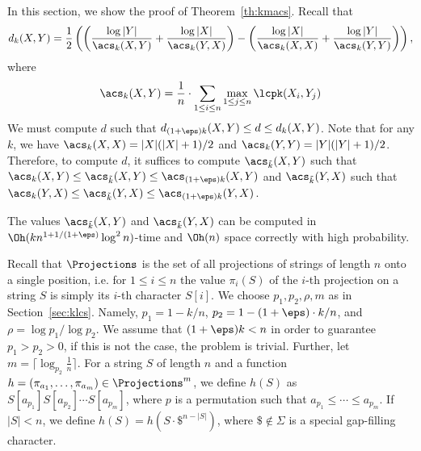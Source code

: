 In this section, we show the proof of Theorem~\ref{th:kmacs}. Recall that 
$$d_k(X, Y) = \frac{1}{2} \left(\left( \frac{\log |Y|}{\acs_k(X, Y)} + \frac{\log |X|}{\acs_k(Y,X)}\right) - \left(\frac{\log |X|}{\acs_k(X, X)} + \frac{\log |Y|}{\acs_k(Y, Y)}\right)\right),$$ 
where
$$\acs_k(X, Y) = \frac{1}{n} \cdot \sum_{1 \le i \le n} \max_{1 \le j \le n} \lcpk(X_i, Y_j)$$
We must compute $d$ such that $d_{(1+\eps)k} (X, Y) \le d \le d_{k} (X, Y)$. Note that for any $k$, we have $\acs_k(X, X) = |X| (|X|+1) / 2$ and $\acs_k(Y, Y) = |Y| (|Y|+1) / 2$. Therefore, to compute $d$, it suffices to compute $\acs_{\tilde{k}} (X, Y)$ such that $\acs_{k} (X, Y) \le \acs_{\tilde{k}} (X, Y) \le \acs_{(1+\eps)k} (X, Y)$ and $\acs_{\tilde{k}} (Y, X)$ such that $\acs_{k} (Y, X) \le \acs_{\tilde{k}} (Y, X) \le \acs_{(1+\eps)k} (Y, X)$.

\begin{lemma}
\label{lm:kmacs}
The values $\acs_{\tilde{k}} (X, Y)$ and $\acs_{\tilde{k}} (Y, X)$ can be computed in $\Oh(k n^{1+1/(1+\eps)} \log^2 n)$-time and $\Oh(n)$ space correctly with high probability.
\end{lemma}

Recall that $\Projections$ is the set of all projections of strings of length $n$ onto a single position, i.e. for $1 \le i \le n$ the value $\pi_i(S)$ of the $i$-th projection on a string $S$ is simply its $i$-th character $S[i]$. We choose $p_1, p_2, \rho, m$ as in Section~\ref{sec:klcs}. Namely, $p_1 = 1 - k / n$, $p_2 = 1 - (1+\eps) \cdot k / n$, and $\rho =\log p_1 / \log p_2$. We assume that $(1+\eps)k < n$ in order to guarantee $p_1 > p_2 > 0$, if this is not the case, the problem is trivial. Further, let $m = \lceil \log_{p_2}{\tfrac{1}{n}} \rceil$. For a string $S$ of length $n$ and a function $h=(\pi_{a_1},\ldots,\pi_{a_m}) \in \Projections^m$, we define $h(S)$ as $S[a_{p_1}] S[a_{p_2}] \cdots S[a_{p_m}]$, where $p$ is a permutation such that $a_{p_1}\le \cdots \le a_{p_m}$. If $|S|<n$, we define $h(S) = h(S \cdot \$^{n-|S|})$, where $ \$\notin \Sigma$ is a special gap-filling character.

